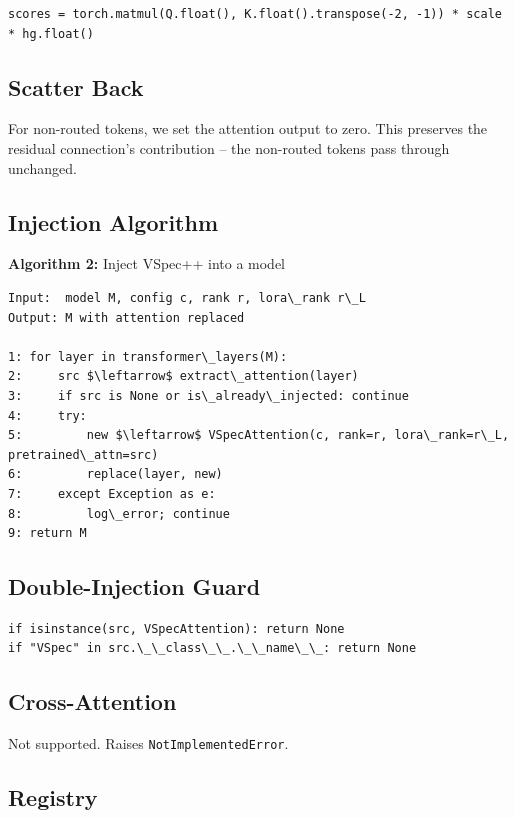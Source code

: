 \begin{lstlisting}
scores = torch.matmul(Q.float(), K.float().transpose(-2, -1)) * scale * hg.float()
\end{lstlisting}

\subsection{Scatter Back}

For non-routed tokens, we set the attention output to zero. This preserves 
the residual connection's contribution -- the non-routed tokens pass 
through unchanged.

\subsection{Injection Algorithm}

\textbf{Algorithm 2:} Inject VSpec++ into a model
\begin{lstlisting}
Input:  model M, config c, rank r, lora\_rank r\_L
Output: M with attention replaced

1: for layer in transformer\_layers(M):
2:     src $\leftarrow$ extract\_attention(layer)
3:     if src is None or is\_already\_injected: continue
4:     try:
5:         new $\leftarrow$ VSpecAttention(c, rank=r, lora\_rank=r\_L, pretrained\_attn=src)
6:         replace(layer, new)
7:     except Exception as e:
8:         log\_error; continue
9: return M
\end{lstlisting}

\subsection{Double-Injection Guard}

\begin{lstlisting}
if isinstance(src, VSpecAttention): return None
if "VSpec" in src.\_\_class\_\_.\_\_name\_\_: return None
\end{lstlisting}

\subsection{Cross-Attention}

Not supported. Raises \texttt{NotImplementedError}.

\subsection{Registry}

